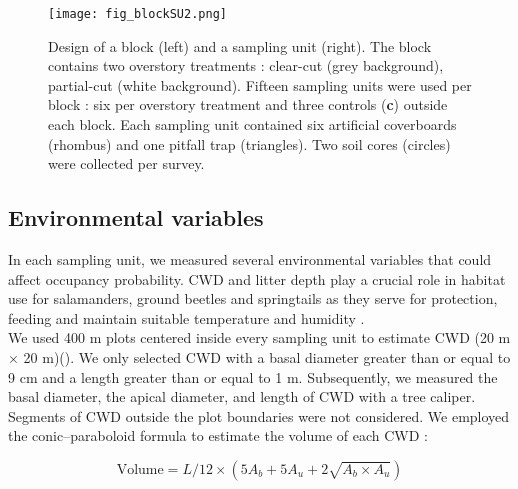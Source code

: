 \begin{figure}[ht]
	\centering
	\texttt{[image: fig\_blockSU2.png]}
	\caption[Design of one block and one sampling unit with three sampling methods.]{
  Design of a block (left) and a sampling unit (right). 
  The block contains two overstory treatments : clear-cut (grey background), partial-cut (white background). 
  Fifteen sampling units were used per block : six per overstory treatment and three controls (\textbf{c}) outside each block.
  Each sampling unit contained six artificial coverboards (rhombus) and one pitfall trap (triangles). Two soil cores (circles) were collected per survey.
  }
	\label{fig:blockSU}
	\end{figure}  

  \vspace{0.5cm}


\subsection*{Environmental variables}
\label{subsec:EnvVar}

In each sampling unit, we measured several environmental variables that could affect occupancy probability.
CWD and litter depth play a crucial role in habitat use for salamanders, ground beetles and springtails as
they serve for protection, feeding and maintain suitable temperature and humidity \citep{birdChangesSoilLitter2004,groverInfluenceCoverMoisture1998a,harmonEcologyCoarseWoody1986,koivula.LeafLitterSmallscale1999,mckennyEffectsStructuralComplexity2006,patrickEffectsExperimentalForestry2006a}. \\
We used 400 m plots centered inside every sampling unit to estimate CWD (20 m $\times$  20 m)(\citealp{methotGuideInventaireEchantillonnage2014}). 
We only selected CWD with a basal diameter greater than or equal to 9 cm and a length greater than or equal to 1 m.
Subsequently, we measured the basal diameter, the apical diameter, and length of CWD with a tree caliper.
Segments of CWD outside the plot boundaries were not considered.
We employed the conic–paraboloid formula to estimate the volume of each CWD \citep{fraverRefiningVolumeEstimates2007} :

\begin{equation}
  \text{Volume} = L/12 \times (5A_b + 5A_u + 2\sqrt{A_b \times A_u})
\end{equation}

\vspace{0.5cm}

